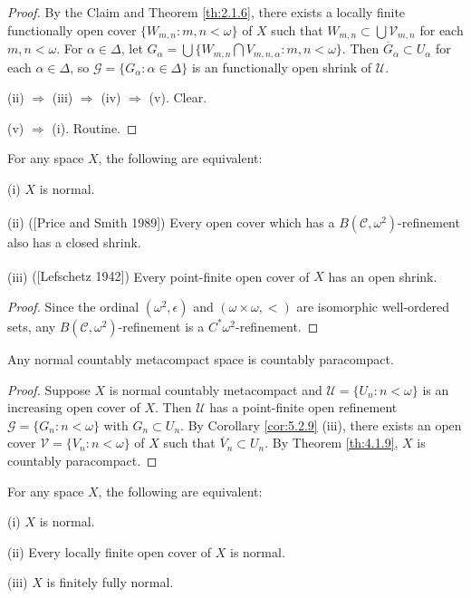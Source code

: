 \documentclass[jisng5i.tex]{subfiles}
\begin{document}
\begin{proof}
By the Claim and Theorem \ref{th:2.1.6}, there exists a locally finite functionally open 
cover $\{W_{m,n}:  m,n<\omega\}$ of $X$ such that 
$W_{m,n} \subset \bigcup \mathscr{V}_{m,n}$ for each $m, n < \omega$.
For $\alpha\in \Delta$, let $G_\alpha = \bigcup \{W_{m,n} \bigcap V_{m,n,\alpha}: m, n < \omega\}$. 
Then $\overline{G}_\alpha \subset U_\alpha$ for each $\alpha\in\Delta$, so 
$\mathscr{G} = \{G_\alpha: \alpha\in\Delta\}$ is an functionally open shrink of $\mathscr{U}$.

(ii) $\Rightarrow$ (iii) $\Rightarrow$ (iv) $\Rightarrow$ (v). Clear.

(v) $\Rightarrow$ (i). Routine.
\end{proof}

{\corollary{} \label{cor:5.2.9}
For any space $X$, the following are equivalent:

\textup{(i)} $X$ is normal.

\textup{(ii)}  \textup{([Price and Smith 1989]\textsuperscript{\cite{PriceSmith}})}
Every open cover which has a $B(\mathcal{C}, \omega^2)$-refinement also has a closed shrink.

\textup{(iii)} \textup{([Lefschetz 1942]\textsuperscript{\cite{Lefschetz}})} 
Every point-finite open cover of $X$ has an open shrink.
}

\begin{proof} 
Since the ordinal $(\omega^2, \epsilon)$ and $(\omega\times\omega, <)$ are isomorphic 
well-ordered sets, any $B(\mathcal{C}, \omega^2)$-refinement is a $C^*\omega^2$-refinement.
\end{proof}

{\lemma{} \label{lem:5.2.10}
Any normal countably metacompact space is countably paracompact.
}

\begin{proof}
Suppose $X$ is normal countably metacompact and $\mathscr{U} = \{U_n: n < \omega\}$ is
an increasing open cover of $X$. Then $\mathscr{U}$ has a point-finite open refinement 
$\mathscr{G} = \{G_n: n <  \omega\}$ with $G_n\subset U_n$. 
By Corollary \ref{cor:5.2.9} (iii), there exists an open cover $\mathscr{V} = \{V_n: n< \omega\}$ of 
$X$ such that $\overline{V}_n \subset U_n$. By Theorem \ref{th:4.1.9}, $X$ is countably paracompact.
\end{proof}

{\theorem{} \label{th:5.2.11}
For any space $X$, the following are equivalent:

\textup{(i)}  $X$ is normal.

\textup{(ii)}  Every locally finite open cover of $X$ is normal.

\textup{(iii)} $X$ is finitely fully normal.
}
\end{document}
